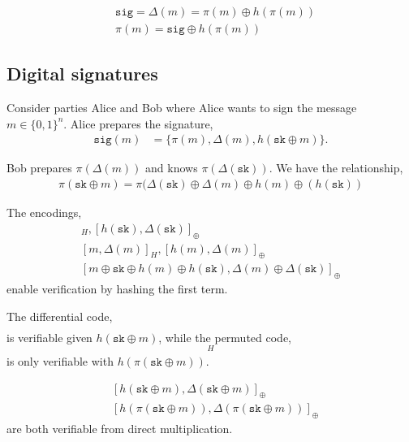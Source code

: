 \documentclass[twocolumn, aps, amsmath, amssymb, nofootinbib, superscriptaddress, longbibliography, doublefloatfix, table-of-contents, eqsecnum, rmp]{revtex4-2}
\begin{document}
\begin{align}
	&\mathtt{sig} = \Delta(m) = \pi(m) \oplus h(\pi(m)) \nonumber\\
	&\pi(m) = \mathtt{sig} \oplus h(\pi(m)) 
\end{align}

\subsection{Digital signatures}

Consider parties Alice and Bob where Alice wants to sign the message \mbox{$m\in \{0,1\}^n$}. Alice prepares the signature,
\begin{align}
	\mathtt{sig}(m) &= \{\pi(m), \Delta(m), h(\mathtt{sk} \oplus m)\}.
\end{align}

Bob prepares $\pi(\Delta(m))$ and knows $\pi(\Delta(\mathtt{sk}))$. We have the relationship,
\begin{align}
	\pi(\mathtt{sk} \oplus m) = \pi(\Delta(\mathtt{sk}) \oplus \Delta(m) \oplus h(m) \oplus(h(\mathtt{sk}))%
\end{align}

The encodings,
\begin{align}
	[\mathtt{sk}, \Delta(\mathtt{sk})]_H, [h(\mathtt{sk}), \Delta(\mathtt{sk})]_\oplus \nonumber\\
	[m, \Delta(m)]_H, [h(m), \Delta(m)]_\oplus \nonumber\\
	[m \oplus \mathtt{sk} \oplus h(m) \oplus h(\mathtt{sk}), \Delta(m) \oplus \Delta(\mathtt{sk})]_\oplus
\end{align}
enable verification by hashing the first term.

The differential code,
\begin{align}
	[\mathtt{sk} \oplus m, \Delta(\mathtt{sk} \oplus m)] %
\end{align}
is verifiable given $h(\mathtt{sk} \oplus m)$, while the permuted code,
\begin{align}
	[\pi(\mathtt{sk} \oplus m), \Delta(\pi(\mathtt{sk} \oplus m))]_H 
\end{align}
is only verifiable with $h(\pi(\mathtt{sk} \oplus m))$.

\begin{align}
	&[h(\mathtt{sk} \oplus m), \Delta(\mathtt{sk} \oplus m)]_\oplus \nonumber\\
	&[h(\pi(\mathtt{sk} \oplus m)), \Delta(\pi(\mathtt{sk} \oplus m))]_\oplus
\end{align}
are both verifiable from direct multiplication.
\end{document}
